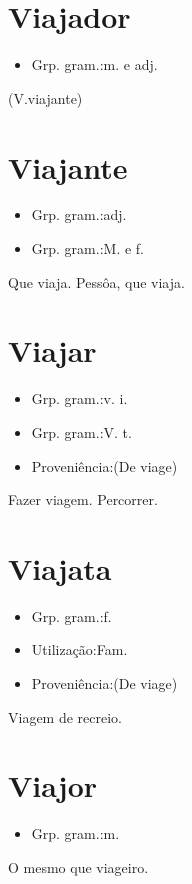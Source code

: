 \documentclass{article}
\begin{document}
\section{Viajador}
\begin{itemize}
\item {Grp. gram.:m.  e  adj.}
\end{itemize}
(V.viajante)
\section{Viajante}
\begin{itemize}
\item {Grp. gram.:adj.}
\end{itemize}
\begin{itemize}
\item {Grp. gram.:M.  e  f.}
\end{itemize}
Que viaja.
Pessôa, que viaja.
\section{Viajar}
\begin{itemize}
\item {Grp. gram.:v. i.}
\end{itemize}
\begin{itemize}
\item {Grp. gram.:V. t.}
\end{itemize}
\begin{itemize}
\item {Proveniência:(De \textunderscore viage\textunderscore )}
\end{itemize}
Fazer viagem.
Percorrer.
\section{Viajata}
\begin{itemize}
\item {Grp. gram.:f.}
\end{itemize}
\begin{itemize}
\item {Utilização:Fam.}
\end{itemize}
\begin{itemize}
\item {Proveniência:(De \textunderscore viage\textunderscore )}
\end{itemize}
Viagem de recreio.
\section{Viajor}
\begin{itemize}
\item {Grp. gram.:m.}
\end{itemize}
O mesmo que \textunderscore viageiro\textunderscore .
\end{document}

